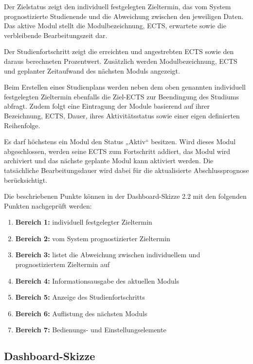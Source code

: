 \documentclass[11pt,a4paper]{article}
\begin{document}
Der Zielstatus zeigt den individuell festgelegten Zieltermin, das vom System prognostizierte Studienende und die Abweichung zwischen den jeweiligen Daten. Das aktive Modul stellt die Modulbezeichnung, ECTS, erwartete sowie die verbleibende Bearbeitungszeit dar.

Der Studienfortschritt zeigt die erreichten und angestrebten ECTS sowie den daraus berechneten Prozentwert. Zusätzlich werden Modulbezeichnung, ECTS und geplanter Zeitaufwand des nächsten Moduls angezeigt.

Beim Erstellen eines Studienplans werden neben dem oben genannten individuell festgelegten Zieltermin ebenfalls die Ziel-ECTS zur Beendingung des Studiums abfragt. Zudem folgt eine Eintragung der Module basierend auf ihrer Bezeichnung, ECTS, Dauer, ihres Aktivitätsstatus sowie einer eigen definierten Reihenfolge.

Es darf höchstens ein Modul den Status „Aktiv“ besitzen. Wird dieses Modul abgeschlossen, werden seine ECTS zum Fortschritt addiert, das Modul wird archiviert und das nächste geplante Modul kann aktiviert werden. Die tatsächliche Bearbeitungsdauer wird dabei für die aktualisierte Abschlussprognose berücksichtigt.

\newpage

Die beschriebenen Punkte können in der Dashboard-Skizze 2.2 mit den folgenden Punkten nachgeprüft werden: 



\begin{enumerate}
    \item \textbf{Bereich 1:} individuell festgelegter Zieltermin
    \item \textbf{Bereich 2:} vom System prognostizierter Zieltermin
    \item \textbf{Bereich 3:} listet die Abweichung zwischen individuellem  und prognostiziertem Zieltermin auf
    \item \textbf{Bereich 4:} Informationsausgabe des aktuellen Moduls
    \item \textbf{Bereich 5:} Anzeige des Studienfortschritts
    \item \textbf{Bereich 6:} Auflistung des nächsten Moduls
    \item \textbf{Bereich 7:} Bedienungs- und Einstellungselemente

\end{enumerate}

\subsection{Dashboard-Skizze}
\end{document}
